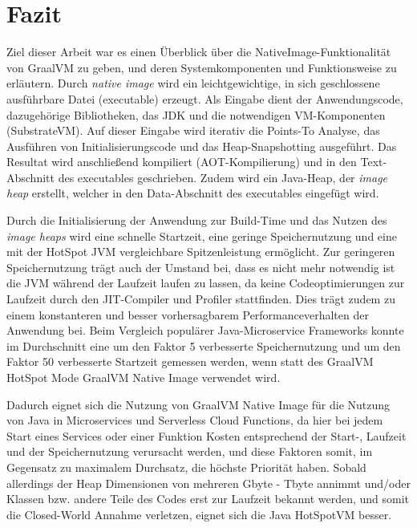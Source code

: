 \newpage
\section{Fazit}
\label{sec:fazit}

Ziel dieser Arbeit war es einen Überblick über die NativeImage-Funktionalität von GraalVM zu geben, und deren Systemkomponenten und Funktionsweise zu erläutern. 
Durch \textit{native image} wird ein leichtgewichtige, in sich geschlossene ausführbare Datei (executable) erzeugt. Als Eingabe dient der Anwendungscode, dazugehörige Bibliotheken, das JDK und 
die notwendigen VM-Komponenten (SubstrateVM). Auf dieser Eingabe wird iterativ die Points-To Analyse, das Ausführen
von Initialisierungscode und das Heap-Snapshotting ausgeführt. Das Resultat wird anschließend kompiliert (AOT-Kompilierung) und in den Text-Abschnitt des executables geschrieben. Zudem wird ein Java-Heap, der \textit{image heap}
erstellt, welcher in den Data-Abschnitt des executables eingefügt wird. 

Durch die Initialisierung der Anwendung zur Build-Time und das Nutzen des \textit{image heaps} wird eine schnelle Startzeit, eine geringe Speichernutzung und eine mit der HotSpot JVM vergleichbare Spitzenleistung
ermöglicht.  Zur geringeren Speichernutzung trägt auch der Umstand bei, dass es nicht mehr notwendig ist die JVM während der Laufzeit laufen zu lassen,
 da keine Codeoptimierungen zur Laufzeit durch den JIT-Compiler und Profiler stattfinden. Dies trägt zudem zu einem konstanteren und besser vorhersagbarem Performanceverhalten der Anwendung bei.
 Beim Vergleich populärer Java-Microservice Frameworks konnte im Durchschnitt eine um den Faktor 5 verbesserte Speichernutzung
und um den Faktor 50 verbesserte Startzeit gemessen werden, wenn statt des GraalVM HotSpot Mode GraalVM Native Image verwendet wird.

Dadurch eignet sich die Nutzung von GraalVM Native Image für die Nutzung von Java in Microservices und Serverless Cloud Functions, da hier bei jedem Start eines Services oder einer Funktion 
Kosten entsprechend der Start-, Laufzeit und der Speichernutzung verursacht werden, und diese Faktoren somit, im Gegensatz zu maximalem Durchsatz, die höchste Priorität haben. 
Sobald allerdings der Heap Dimensionen von mehreren Gbyte - Tbyte annimmt und/oder Klassen bzw. andere Teile des Codes erst zur Laufzeit bekannt werden, und somit die Closed-World Annahme verletzen,
 eignet sich die Java HotSpotVM besser. 
